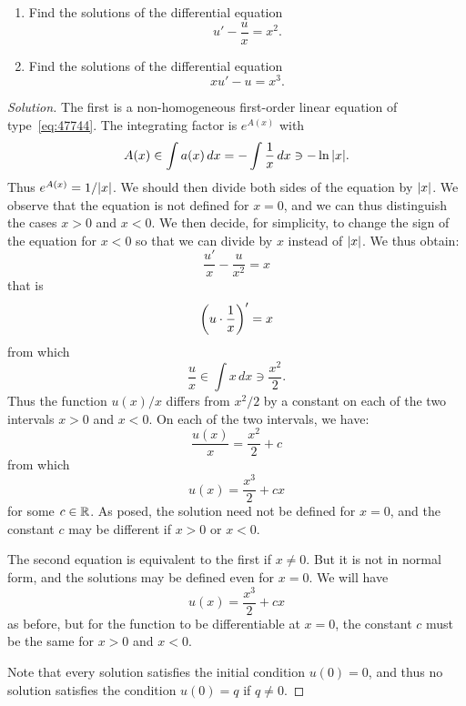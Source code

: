 \begin{exercise}
\begin{enumerate}
\item
Find the solutions of the differential equation
\[
  u' - \frac{u}{x} = x^2.
\]

\item
Find the solutions of the differential equation
\[
  x u' - u = x^3.
\]
\end{enumerate}
\end{exercise}
\begin{proof}[Solution]
The first is a non-homogeneous first-order linear equation of
type~\eqref{eq:47744}. The integrating factor is $e^{A(x)}$ with
\[
  A(x) \in \int a(x)\, dx = -\int \frac{1}{x}\, dx \ni - \ln {\left|x\right|}.
\]
Thus $e^{A(x)} = 1/{\left|x\right|}$. We should then divide both sides of the equation by
${\left|x\right|}$. We observe that the equation is not defined for $x=0$, and we can
thus distinguish the cases $x>0$ and $x<0$. We then decide, for simplicity, to
change the sign of the equation for $x<0$ so that we can divide by $x$ instead
of ${\left|x\right|}$.
We thus obtain:
\[
  \frac{u'}{x} - \frac{u}{x^2} = x
\]
that is
\[
  {\left( u\cdot \frac{1}{x} \right)}'  = x
\]
from which
\[
  \frac{u}{x} \in \int x\, dx \ni \frac{x^2}{2}.
\]
Thus the function $u(x)/x$ differs from $x^2/2$ by a constant on each of the two
intervals $x>0$ and $x<0$. On each of the two intervals, we have:
\[
  \frac{u(x)}{x} = \frac{x^2}{2} + c
\]
from which
\[
  u(x) = \frac{x^3}{2} + c x
\]
for some $c\in {\mathbb R}$. As posed, the solution need not be defined for $x=0$, and
the constant $c$ may be different if $x>0$ or $x<0$.

The second equation is equivalent to the first if $x\neq 0$. But it is not in
normal form, and the solutions may be defined even for $x=0$.
We will have
\[
  u(x) = \frac{x^3}{2} + c x
\]
as before, but for the function to be differentiable at $x=0$, the constant $c$
must be the same for $x>0$ and $x<0$.

Note that every solution satisfies the initial condition $u(0) = 0$, and thus no
solution satisfies the condition $u(0)= q$ if $q \neq 0$.
\end{proof}

